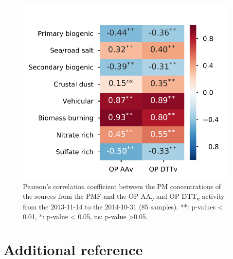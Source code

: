 \documentclass[12pt]{article}
\begin{document}
\begin{figure}[h]
    \centering
    \includegraphics{figures/SI_fig03}
    \caption{Pearson's correlation coefficient between the PM concentrations of
        the sources from the PMF and the OP AA\textsubscript{v} and OP
        DTT\textsubscript{v} activity from the 2013-11-14 to the 2014-10-31 (85
        samples). **: p-values \textless{} 0.01, *: p-value \textless{} 0.05,
    ns: p-value \textgreater{}0.05.}
    \label{fig:pearsonrSrc}
\end{figure}

\section{Additional reference}\label{additional-reference}


\end{document}
